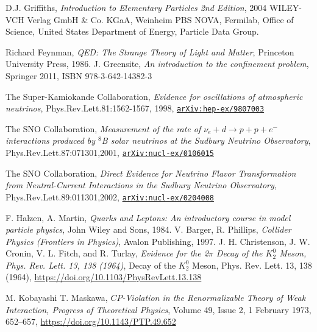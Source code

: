 \documentclass[12pt,a4paper,openright,twoside]{report}
\newcommand{\bibref}[4]{#1, \textit{#2}, #3 #4}
\begin{document}
\begin{thebibliography}{9}
	\bibref{D.J. Griffiths}{Introduction to Elementary Particles 2nd Edition}{2004 WILEY-VCH Verlag GmbH \& Co. KGaA, Weinheim}

	PBS NOVA, Fermilab, Office of Science, United States Department of Energy, Particle Data Group.
	
	\bibref{Richard Feynman}{QED: The Strange Theory of Light and Matter}{Princeton University Press, 1986.}
	
	\bibref{J. Greensite}{An introduction to the confinement problem}{Springer 2011,}{ISBN 978-3-642-14382-3}
	
	\bibref{The Super-Kamiokande Collaboration}{Evidence for oscillations of atmospheric neutrinos}{Phys.Rev.Lett.81:1562-1567, 1998,}{\href{https://arxiv.org/abs/hep-ex/9807003}{\texttt{arXiv:hep-ex/9807003}}}
	
	\bibref{The SNO Collaboration}{Measurement of the rate of $\nu_e + d \to p + p + e^-$ interactions produced by ${}^8$B solar neutrinos at the Sudbury Neutrino Observatory}{Phys.Rev.Lett.87:071301,2001,}{\href{https://arxiv.org/abs/nucl-ex/0106015}{\texttt{arXiv:nucl-ex/0106015}}}
	
	\bibref{The SNO Collaboration}{Direct Evidence for Neutrino Flavor Transformation from Neutral-Current Interactions in the Sudbury Neutrino Observatory}{Phys.Rev.Lett.89:011301,2002,}{\href{https://arxiv.org/abs/nucl-ex/0204008}{\texttt{arXiv:nucl-ex/0204008}}}
	
	\bibref{F. Halzen, A. Martin}{Quarks and Leptons: An introductory course in model particle physics}{John Wiley and Sons, 1984.}

	\bibref{V. Barger, R. Phillips}{Collider Physics (Frontiers in Physics)}{Avalon Publishing, 1997.}

	\bibref{J. H. Christenson, J. W. Cronin, V. L. Fitch, and R. Turlay}{Evidence for the 2$\pi$ Decay of the $K_2^0$ Meson, Phys. Rev. Lett. 13, 138 (1964)}{Decay of the $K_2^0$ Meson, Phys. Rev. Lett. 13, 138 (1964),}{\url{https://doi.org/10.1103/PhysRevLett.13.138}}

	\bibref{M. Kobayashi T. Maskawa}{$CP$-Violation in the Renormalizable Theory of Weak Interaction, Progress of Theoretical Physics}{Volume 49, Issue 2, 1 February 1973, 652–657,}{\url{https://doi.org/10.1143/PTP.49.652}}


\end{thebibliography}
\end{document}
